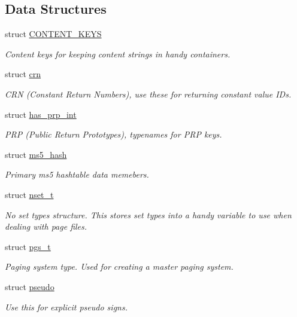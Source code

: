 \subsection*{Data Structures}
\begin{DoxyCompactItemize}
\item 
struct \hyperlink{structcrunchy_1_1_c_o_n_t_e_n_t___k_e_y_s}{C\+O\+N\+T\+E\+N\+T\+\_\+\+K\+E\+YS}
\begin{DoxyCompactList}\small\item\em Content keys for keeping content strings in handy containers. \end{DoxyCompactList}\item 
struct \hyperlink{structcrunchy_1_1crn}{crn}
\begin{DoxyCompactList}\small\item\em C\+RN (Constant Return Numbers), use these for returning constant value ID\textquotesingle{}s. \end{DoxyCompactList}\item 
struct \hyperlink{structcrunchy_1_1has__prp__int}{has\+\_\+prp\+\_\+int}
\begin{DoxyCompactList}\small\item\em P\+RP (Public Return Prototypes), typenames for P\+RP keys. \end{DoxyCompactList}\item 
struct \hyperlink{structcrunchy_1_1ms5__hash}{ms5\+\_\+hash}
\begin{DoxyCompactList}\small\item\em Primary ms5 hashtable data memebers. \end{DoxyCompactList}\item 
struct \hyperlink{structcrunchy_1_1nset__t}{nset\+\_\+t}
\begin{DoxyCompactList}\small\item\em No set types structure. This stores set types into a handy variable to use when dealing with page files. \end{DoxyCompactList}\item 
struct \hyperlink{structcrunchy_1_1pgs__t}{pgs\+\_\+t}
\begin{DoxyCompactList}\small\item\em Paging system type. Used for creating a master paging system. \end{DoxyCompactList}\item 
struct \hyperlink{structcrunchy_1_1pseudo}{pseudo}
\begin{DoxyCompactList}\small\item\em Use this for explicit pseudo signs. \end{DoxyCompactList}\item 

\end{DoxyCompactItemize}
